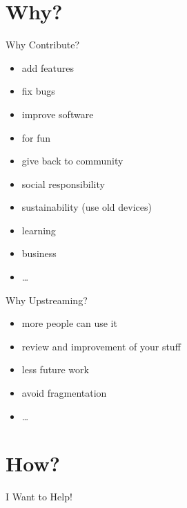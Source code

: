 \documentclass{beamer}
\begin{document}
\section{Why?}

\frame{\tableofcontents[currentsection]}

\begin{frame}{Why Contribute?}
    \begin{itemize}
        \item add features
        \item fix bugs
        \item improve software
        \item for fun
        \item give back to community
        \item social responsibility
        \item sustainability (use old devices)
        \item learning
        \item business
        \item \dots
    \end{itemize}
\end{frame}

\begin{frame}{Why Upstreaming?}
    \begin{itemize}
        \item more people can use it
        \item review and improvement of your stuff
        \item less future work
        \item avoid fragmentation
        \item \dots
    \end{itemize}
\end{frame}


\section{How?}

\frame{\tableofcontents[currentsection]}

\begin{frame}{I Want to Help!}
\end{frame}
\end{document}
